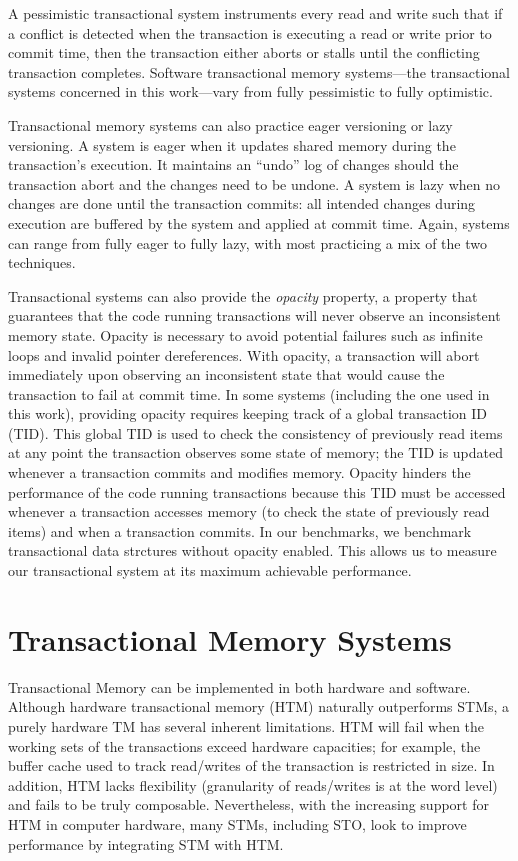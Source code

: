 A pessimistic transactional system instruments every read and write such that if a conflict is detected when the transaction is executing a read or write prior to commit time, then the transaction either aborts or stalls until the conflicting transaction completes. Software transactional memory systems---the transactional systems concerned in this work---vary from fully pessimistic to fully optimistic.

Transactional memory systems can also practice eager versioning or lazy versioning. A system is eager when it updates shared memory during the transaction's execution. It maintains an ``undo'' log of changes should the transaction abort and the changes need to be undone. A system is lazy when no changes are done until the transaction commits: all intended changes during execution are buffered by the system and applied at commit time. Again, systems can range from fully eager to fully lazy, with most practicing a mix of the two techniques.

Transactional systems can also provide the \emph{opacity} property\cite{opacity}, a property that guarantees that the code running transactions will never observe an inconsistent memory state. Opacity is necessary to avoid potential failures such as infinite loops and invalid pointer dereferences. With opacity, a transaction will abort immediately upon observing an inconsistent state that would cause the transaction to fail at commit time. 
In some systems (including the one used in this work), providing opacity requires keeping track of a global transaction ID (TID). This global TID is used to check the consistency of previously read items at any point the transaction observes some state of memory; the TID is updated whenever a transaction commits and modifies memory. Opacity hinders the performance of the code running transactions because this TID must be accessed whenever a transaction accesses memory (to check the state of previously read items) and when a transaction commits. In our benchmarks, we benchmark transactional data strctures without opacity enabled. This allows us to measure our transactional system at its maximum achievable performance.

\section{Transactional Memory Systems}
Transactional Memory can be implemented in both hardware and software. Although hardware transactional memory (HTM) naturally outperforms STMs, a purely hardware TM has several inherent limitations. HTM will fail when the working sets of the transactions exceed hardware capacities; for example, the buffer cache used to track read/writes of the transaction is restricted in size. In addition, HTM lacks flexibility (granularity of reads/writes is at the word level) and fails to be truly composable\cite{htm}. Nevertheless, with the increasing support for HTM in computer hardware, many STMs, including STO, look to improve performance by integrating STM with HTM.

